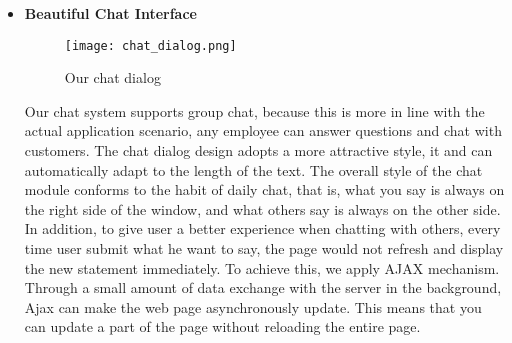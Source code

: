\documentclass[a4paper]{article}
\begin{document}
\begin{itemize}
     \item \textbf{Beautiful Chat Interface}
     \begin{figure}[h]
         \centering
         \texttt{[image: chat\_dialog.png]}
         \caption{Our chat dialog}
         \label{chat_dialog}
     \end{figure}
     \newline
     Our chat system supports group chat, because this is more in line with the actual application scenario, any employee can answer questions and chat with customers. The chat dialog design adopts a more attractive style, it and can automatically adapt to the length of the text. The overall style of the chat module conforms to the habit of daily chat, that is, what you say is always on the right side of the window, and what others say is always on the other side. 
     \newline
     In addition, to give user a better experience when chatting with others, every time user submit what he want to say, the page would not refresh and display the new statement immediately. To achieve this, we apply AJAX mechanism. Through a small amount of data exchange with the server in the background, Ajax can make the web page asynchronously update. This means that you can update a part of the page without reloading the entire page.
\end{itemize}

    
\end{document}
